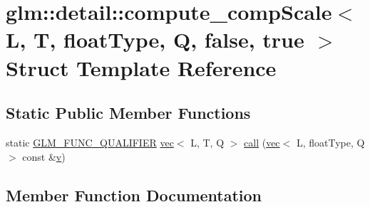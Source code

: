 \hypertarget{structglm_1_1detail_1_1compute__comp_scale_3_01_l_00_01_t_00_01float_type_00_01_q_00_01false_00_01true_01_4}{}\section{glm\+:\+:detail\+:\+:compute\+\_\+comp\+Scale$<$ L, T, float\+Type, Q, false, true $>$ Struct Template Reference}
\label{structglm_1_1detail_1_1compute__comp_scale_3_01_l_00_01_t_00_01float_type_00_01_q_00_01false_00_01true_01_4}
\subsection*{Static Public Member Functions}
\begin{DoxyCompactItemize}
\item 
static \hyperlink{setup_8hpp_a33fdea6f91c5f834105f7415e2a64407}{G\+L\+M\+\_\+\+F\+U\+N\+C\+\_\+\+Q\+U\+A\+L\+I\+F\+I\+ER} \hyperlink{structglm_1_1vec}{vec}$<$ L, T, Q $>$ \hyperlink{structglm_1_1detail_1_1compute__comp_scale_3_01_l_00_01_t_00_01float_type_00_01_q_00_01false_00_01true_01_4_a5db156b269a3f48e8bcb0e04ed5e1f9e}{call} (\hyperlink{structglm_1_1vec}{vec}$<$ L, float\+Type, Q $>$ const \&\hyperlink{_s_d_l__opengl_8h_a10a82eabcb59d2fcd74acee063775f90}{v})
\end{DoxyCompactItemize}


\subsection{Member Function Documentation}
\mbox{\label{structglm_1_1detail_1_1compute__comp_scale_3_01_l_00_01_t_00_01float_type_00_01_q_00_01false_00_01true_01_4_a5db156b269a3f48e8bcb0e04ed5e1f9e}} 
